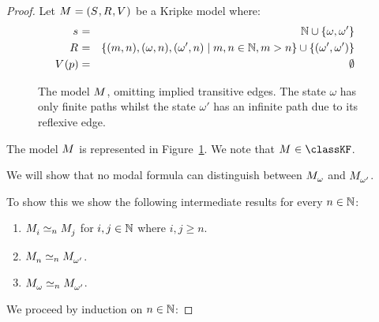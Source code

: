 \begin{proof}
Let $\kModelAndTuple$ be a Kripke model where:
\begin{eqnarray*}
\kStateS &=& \naturals \cup \{\omega, \omega'\}\\
\kAccessibility{} &=& \{(m, n), (\omega, n), (\omega', n) \mid m, n \in \naturals, m > n\} \cup \{(\omega', \omega')\}\\
\kValuation(\atomP) &=& \emptyset
\end{eqnarray*}

\begin{figure}
    \centering
    \caption{The model $\kModel$, omitting implied transitive edges. The state $\omega$ has only finite paths whilst the state $\omega'$ has an infinite path due to its reflexive edge.}\label{model-naturals}
\end{figure}

The model $\kModel$ is represented in Figure~\ref{model-naturals}.
We note that $\kModel \in \classKF$.

We will show that no modal formula can distinguish between $\kPModel{\omega}$ and $\kPModel{\omega'}$.

To show this we show the following intermediate results for every $n \in \mathbb{N}$:
\begin{enumerate}
    \item $\kPModel{i} \bisimilar[n] \kPModel{j}$ for $i, j \in \mathbb{N}$ where $i, j \geq n$.
    \item $\kPModel{n} \bisimilar[n] \kPModel{\omega'}$.
    \item $\kPModel{\omega} \bisimilar[n] \kPModel{\omega'}$.
\end{enumerate}

We proceed by induction on $n \in \mathbb{N}$:


\end{proof}

